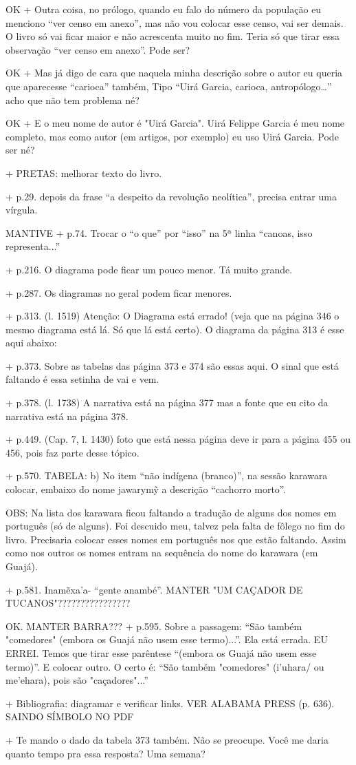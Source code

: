 OK + Outra coisa, no prólogo, quando eu falo do número da população eu menciono “ver censo em anexo”, mas não vou colocar esse censo, vai ser demais. O livro só vai ficar maior e não acrescenta muito no fim. 
Teria só que tirar essa observação “ver censo em anexo”. Pode ser?

OK + Mas já digo de cara que naquela minha descrição sobre o autor eu queria que aparecesse “carioca” também, Tipo “Uirá Garcia, carioca, antropólogo…” acho que não tem problema né?

OK + E o meu nome de autor é "Uirá Garcia". Uirá Felippe Garcia é meu nome completo, mas como autor (em artigos, por exemplo) eu uso Uirá Garcia. Pode ser né?

+ PRETAS: melhorar texto do livro.

+ p.29. depois da frase “a despeito da revolução neolítica”, precisa entrar uma vírgula.

MANTIVE + p.74. Trocar o “o que” por “isso” na 5ª linha “canoas, isso representa...”

+ p.216. O diagrama pode ficar um pouco menor. Tá muito grande.

+ p.287. Os diagramas no geral podem ficar menores.

+ p.313. (l. 1519) Atenção: O Diagrama está errado! (veja que na página 346 o mesmo diagrama está lá. Só que lá está certo). O diagrama da página 313 é esse aqui abaixo:

+ p.373. Sobre as tabelas das página 373 e 374 são essas aqui. O sinal que está faltando é essa setinha de vai e vem.

+ p.378. (l. 1738) A narrativa está na página 377 mas a fonte que eu cito da narrativa está na página 378.

+ p.449. (Cap. 7, l. 1430) foto que está nessa página deve ir para a página 455 ou 456, pois faz parte desse tópico.

+ p.570. TABELA: 
b) No item “não indígena (branco)”, na sessão karawara colocar, embaixo do nome jawarymỹ a descrição “cachorro morto”.

OBS: Na lista dos karawara ficou faltando a tradução de alguns dos nomes em português (só de alguns). Foi descuido meu, talvez pela falta de fôlego no fim do livro. Precisaria colocar esses nomes em português nos que estão faltando. Assim como nos outros os nomes entram na sequência do nome do karawara (em Guajá).

+ p.581. Inamẽxa’a- “gente anambé”.
MANTER "UM CAÇADOR DE TUCANOS"????????????????

OK. MANTER BARRA??? + p.595. Sobre a passagem: “São também "comedores" (embora os Guajá não usem esse termo)...”. Ela está errada. EU ERREI. Temos que tirar esse parêntese “(embora os Guajá não usem esse termo)”. E colocar outro. O certo é: “São também "comedores" (i’uhara/ ou me’ehara), pois são "caçadores"...”

+ Bibliografia: diagramar e verificar links. VER ALABAMA PRESS (p. 636). SAINDO SÍMBOLO NO PDF

+ Te mando o dado da tabela 373 também. Não se preocupe.
Você me daria quanto tempo pra essa resposta? Uma semana?
